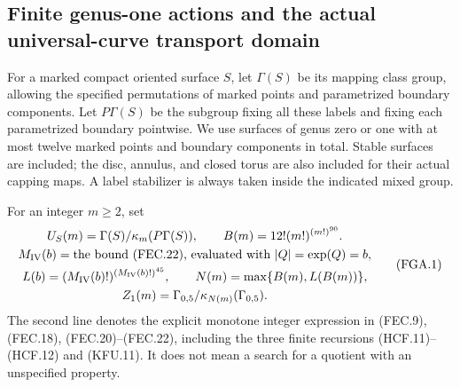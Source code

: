 \subsection{Finite genus-one actions and the actual universal-curve transport domain}

For a marked compact oriented surface $S$, let $\Gamma(S)$
be its mapping class group, allowing the specified permutations
of marked points and parametrized boundary components.  Let
$P\Gamma(S)$ be the subgroup fixing all these labels and
fixing each parametrized boundary pointwise.  We use surfaces
of genus zero or one with at most twelve marked points and
boundary components in total.  Stable surfaces are included;
the disc, annulus, and closed torus are also included for
their actual capping maps.  A label stabilizer is always
taken inside the indicated mixed group.

For an integer $m\geq2$, set
\[
 \begin{gathered}
 U_S(m)=\Gamma(S)/\kappa_m(P\Gamma(S)),\qquad
 B(m)=12!(m!)^{(m!)^{90}}.\\
 M_{\rm IV}(b)=\text{the bound (FEC.22), evaluated with
                       $|Q|=\exp(Q)=b$},\\
 L(b)=(M_{\rm IV}(b)!)^{(M_{\rm IV}(b)!)^{45}},\qquad
 N(m)=\max\{B(m),L(B(m))\},\\
 Z_1(m)=\Gamma_{0,5}/\kappa_{N(m)}(\Gamma_{0,5}).
 \end{gathered}
                                                               \tag{FGA.1}
\]
The second line denotes the explicit monotone integer
expression in (FEC.9), (FEC.18), (FEC.20)--(FEC.22),
including the three finite recursions (HCF.11)--(HCF.12)
and (KFU.11).  It does not mean a search for a quotient
with an unspecified property.

